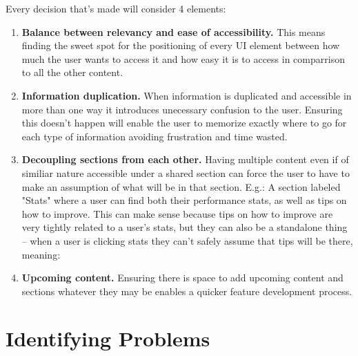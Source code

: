 \documentclass[a4paper,12pt]{article}
\begin{document}
Every decision that's made will consider 4 elements:
\begin{enumerate}[label=\textbf{\arabic*})]
    \item \textbf{Balance between relevancy and ease of accessibility.} This means finding the sweet spot for the positioning of every UI element between how much the user wants to access it and how easy it is to access in comparrison to all the other content.
    \item \textbf{Information duplication.} When information is duplicated and accessible in more than one way it introduces unecessary confusion to the user. Ensuring this doesn't happen will enable the user to memorize exactly where to go for each type of information avoiding frustration and time wasted.
    \item \textbf{Decoupling sections from each other.} Having multiple content even if of similiar nature accessible under a shared section can force the user to have to make an assumption of what will be in that section. E.g.: A section labeled "Stats" where a user can find both their performance stats, as well as tips on how to improve. This can make sense because tips on how to improve are very tightly related to a user's stats, but they can also be a standalone thing -- when a user is clicking stats they can't safely assume that tips will be there, meaning:
    \item \textbf{Upcoming content.} Ensuring there is space to add upcoming content and sections whatever they may be enables a quicker feature development process.
\end{enumerate}

\newpage
\section{Identifying Problems}
\end{document}
